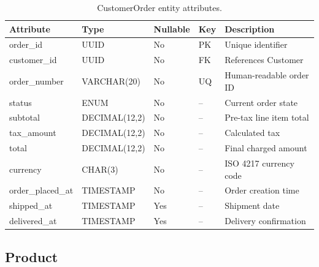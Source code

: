 \documentclass[
    language=english,
    doctype=data-dictionary,
    institution=none,
]{../../omnilatex}
\begin{document}
\begin{table}[h]
    \centering
    \begin{tabular}{llllp{3.5cm}}
        \toprule
        \textbf{Attribute} & \textbf{Type} & \textbf{Nullable} & \textbf{Key} & \textbf{Description} \\
        \midrule
        order\_id & UUID & No & PK & Unique identifier \\
        customer\_id & UUID & No & FK & References Customer \\
        order\_number & VARCHAR(20) & No & UQ & Human-readable order ID \\
        status & ENUM & No & -- & Current order state \\
        subtotal & DECIMAL(12,2) & No & -- & Pre-tax line item total \\
        tax\_amount & DECIMAL(12,2) & No & -- & Calculated tax \\
        total & DECIMAL(12,2) & No & -- & Final charged amount \\
        currency & CHAR(3) & No & -- & ISO 4217 currency code \\
        order\_placed\_at & TIMESTAMP & No & -- & Order creation time \\
        shipped\_at & TIMESTAMP & Yes & -- & Shipment date \\
        delivered\_at & TIMESTAMP & Yes & -- & Delivery confirmation \\
        \bottomrule
    \end{tabular}
    \caption{CustomerOrder entity attributes.}
\end{table}

\subsection{Product}
\end{document}
